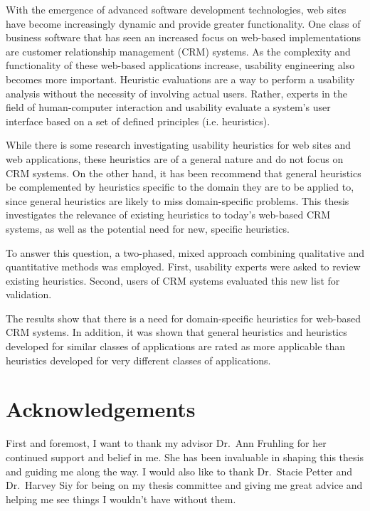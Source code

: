 \documentclass[letterpaper,12pt,oneside,final]{book}
\begin{document}
With the emergence of advanced software development technologies, web sites have become increasingly dynamic and provide greater functionality. One class of business software that has seen an increased focus on web-based implementations are customer relationship management (CRM) systems. As the complexity and functionality of these web-based applications increase, usability engineering also becomes more important. Heuristic evaluations are a way to perform a usability analysis without the necessity of involving actual users. Rather, experts in the field of human-computer interaction and usability evaluate a system's user interface based on a set of defined principles (i.e. heuristics).

While there is some research investigating usability heuristics for web sites and web applications, these heuristics are of a general nature and do not focus on CRM systems. On the other hand, it has been recommend that general heuristics be complemented by heuristics specific to the domain they are to be applied to, since general heuristics are likely to miss domain-specific problems. This thesis investigates the relevance of existing heuristics to today's web-based CRM systems, as well as the potential need for new, specific heuristics.

To answer this question, a two-phased, mixed approach combining qualitative and quantitative methods was employed. First, usability experts were asked to review existing heuristics. Second, users of CRM systems evaluated this new list for validation.

The results show that there is a need for domain-specific heuristics for web-based CRM systems. In addition, it was shown that general heuristics and heuristics developed for similar classes of applications are rated as more applicable than heuristics developed for very different classes of applications.

\newpage
{}

\chapter*{Acknowledgements}
First and foremost, I want to thank my advisor Dr.\ Ann Fruhling for her continued support and belief in me. She has been invaluable in shaping this thesis and guiding me along the way. I would also like to thank Dr.\ Stacie Petter and Dr.\ Harvey Siy for being on my thesis committee and giving me great advice and helping me see things I wouldn't have without them.
\end{document}
